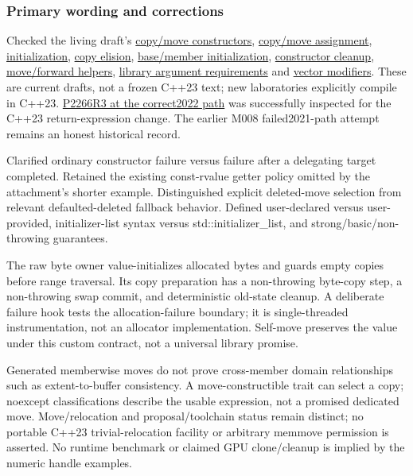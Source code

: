 \subsubsection{Primary wording and corrections}\label{appendix-a103e7846d21-primary-wording-and-corrections}

Checked the living draft's \href{https://eel.is/c++draft/class.copy.ctor}{copy/move constructors}, \href{https://eel.is/c++draft/class.copy.assign}{copy/move assignment}, \href{https://eel.is/c++draft/dcl.init}{initialization}, \href{https://eel.is/c++draft/class.copy.elision}{copy elision}, \href{https://eel.is/c++draft/class.base.init}{base/member initialization}, \href{https://eel.is/c++draft/except.ctor}{constructor cleanup}, \href{https://eel.is/c++draft/forward}{move/forward helpers}, \href{https://eel.is/c++draft/utility.arg.requirements}{library argument requirements} and \href{https://eel.is/c++draft/vector.modifiers}{vector modifiers}. These are current drafts, not a frozen C++23 text; new laboratories explicitly compile in C++23. \href{https://www.open-std.org/jtc1/sc22/wg21/docs/papers/2022/p2266r3.html}{P2266R3 at the correct2022 path} was successfully inspected for the C++23 return-expression change. The earlier M008 failed2021-path attempt remains an honest historical record.

Clarified ordinary constructor failure versus failure after a delegating target completed. Retained the existing const-rvalue getter policy omitted by the attachment's shorter example. Distinguished explicit deleted-move selection from relevant defaulted-deleted fallback behavior. Defined user-declared versus user-provided, initializer-list syntax versus std::initializer\_list, and strong/basic/non-throwing guarantees.

The raw byte owner value-initializes allocated bytes and guards empty copies before range traversal. Its copy preparation has a non-throwing byte-copy step, a non-throwing swap commit, and deterministic old-state cleanup. A deliberate failure hook tests the allocation-failure boundary; it is single-threaded instrumentation, not an allocator implementation. Self-move preserves the value under this custom contract, not a universal library promise.

Generated memberwise moves do not prove cross-member domain relationships such as extent-to-buffer consistency. A move-constructible trait can select a copy; noexcept classifications describe the usable expression, not a promised dedicated move. Move/relocation and proposal/toolchain status remain distinct; no portable C++23 trivial-relocation facility or arbitrary memmove permission is asserted. No runtime benchmark or claimed GPU clone/cleanup is implied by the numeric handle examples.

